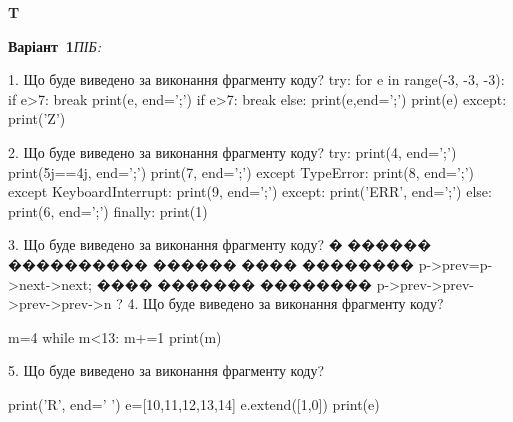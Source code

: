 \documentclass[11pt]{article}
\begin{document}
{\large\textbf{T}}

\textbf{Варіант \No\,1}\hfill \textit{ПІБ:}\,\underline{\hspace{60mm}}
\vspace{4mm}

1. Що буде виведено за виконання фрагменту коду?
try:
    for e in range(-3, -3, -3):
        if e>7:
            break
        print(e, end=';')
        if e>7:
            break
    else:
        print(e,end=';')
    print(e)
except:
    print('Z')

2. Що буде виведено за виконання фрагменту коду?
try:
    print(4, end=';')
    print(5j==4j, end=';')
    print(7, end=';')
except TypeError:
    print(8, end=';')
except KeyboardInterrupt:
    print(9, end=';')
except:
    print('ERR', end=';')
else:
    print(6, end=';')
finally:
    print(1)

3. Що буде виведено за виконання фрагменту коду?
� ������ ���������� ������ ���� �������� p->prev=p->next->next;
���� ������� �������� p->prev->prev->prev->prev->n ?
4. Що буде виведено за виконання фрагменту коду?

m=4
while m<13:
    m+=1
print(m)


5. Що буде виведено за виконання фрагменту коду?

print('R', end=' ')
e=[10,11,12,13,14]
e.extend([1,0])
print(e)







\newpage
\end{document}

